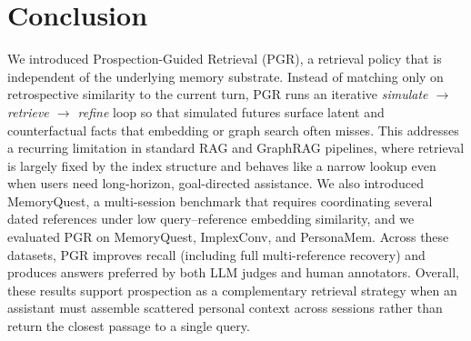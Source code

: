 \section{Conclusion}
\label{sec:conclusion}

We introduced Prospection-Guided Retrieval (PGR), a retrieval policy that is independent of the underlying memory substrate. Instead of matching only on retrospective similarity to the current turn, PGR runs an iterative \emph{simulate $\rightarrow$ retrieve $\rightarrow$ refine} loop so that simulated futures surface latent and counterfactual facts that embedding or graph search often misses. This addresses a recurring limitation in standard RAG and GraphRAG pipelines, where retrieval is largely fixed by the index structure and behaves like a narrow lookup even when users need long-horizon, goal-directed assistance. We also introduced MemoryQuest, a multi-session benchmark that requires coordinating several dated references under low query--reference embedding similarity, and we evaluated PGR on MemoryQuest, ImplexConv, and PersonaMem. Across these datasets, PGR improves recall (including full multi-reference recovery) and produces answers preferred by both LLM judges and human annotators. Overall, these results support prospection as a complementary retrieval strategy when an assistant must assemble scattered personal context across sessions rather than return the closest passage to a single query.

